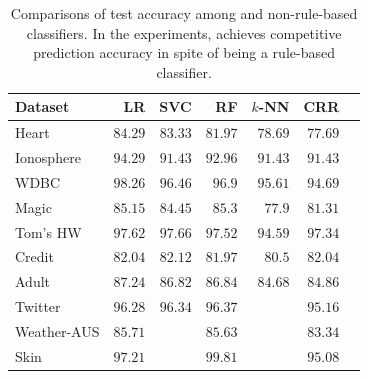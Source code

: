 \begin{table}[tb]
	\begin{center}
		\begin{tabular}{l   r r r r r  r }
			\toprule
			{Dataset}  & LR & SVC & RF & $k$-NN & CRR\\\midrule
			\multirow{1}{*}{ Heart}   & $   84.29  $    & $   83.33  $    & $   81.97  $    & $   78.69  $    & $   77.69  $   \\ 
			\multirow{1}{*}{ Ionosphere}   & $   94.29  $    & $   91.43  $    & $   92.96  $    & $   91.43  $    & $   91.43  $   \\ 
			\multirow{1}{*}{ WDBC}   & $   98.26  $    & $   96.46  $    & $   96.9  $    & $   95.61  $    & $   94.69  $   \\ 
			\multirow{1}{*}{ Magic}   & $   85.15  $    & $   84.45  $    & $   85.3  $    & $   77.9  $    & $   81.31  $   \\ 
			\multirow{1}{*}{ Tom's HW}   & $   97.62  $    & $   97.66  $    & $   97.52  $    & $   94.59  $    & $   97.34  $   \\ 
			\multirow{1}{*}{ Credit}   & $   82.04  $    & $   82.12  $    & $   81.97  $    & $   80.5  $    & $   82.04  $   \\ 
			\multirow{1}{*}{ Adult}   & $   87.24  $    & $   86.82  $    & $   86.84  $    & $   84.68  $    & $   84.86  $   \\ 
			\multirow{1}{*}{ Twitter}   & $   96.28  $    & $   96.34  $    & $   96.37  $     &  \multicolumn{1}{c}{\textemdash}      & $   95.16  $   \\ 
			\multirow{1}{*}{ Weather-AUS}   & $   85.71  $     &  \multicolumn{1}{c}{\textemdash}      & $   85.63  $     &  \multicolumn{1}{c}{\textemdash}      & $   83.34  $   \\ 
			\multirow{1}{*}{ Skin}   & $   97.21  $     &  \multicolumn{1}{c}{\textemdash}      & $   99.81  $     &  \multicolumn{1}{c}{\textemdash}      & $   95.08  $   \\ 
			\bottomrule
		\end{tabular}
	\end{center}
	\caption{Comparisons of test accuracy among {\crr} and  non-rule-based classifiers. In the experiments, {\crr} achieves competitive prediction accuracy in spite of being a rule-based classifier.}
	\label{interpretability_crr_tab:all_classifiers}
\end{table}





